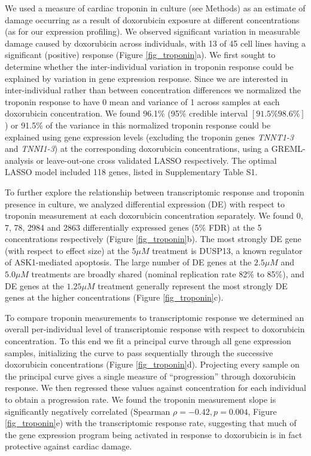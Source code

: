 \documentclass{article}
\begin{document}
We used a measure of cardiac troponin in culture (see Methods) as an estimate of damage occurring as a result of doxorubicin exposure at different concentrations (as for our expression profiling). We observed significant variation in measurable damage caused by doxorubicin across individuals, with 13 of 45 cell lines having a significant (positive) response (Figure \ref{fig_troponin}a). We first sought to determine whether the inter-individual variation in troponin response could be explained by variation in gene expression response. Since we are interested in inter-individual rather than between concentration differences we normalized the troponin response to have 0 mean and variance of 1 across samples at each doxorubicin concentration. We found 96.1\% (95\% credible interval $[91.5\% 98.6\%]$) or 91.5\% of the variance in this normalized troponin response could be explained using gene expression levels (excluding the troponin genes \emph{TNNT1-3} and \emph{TNNI1-3}) at the corresponding doxorubicin concentrations, using a GREML-analysis\cite{Yang2010-cx} or leave-out-one cross validated LASSO\cite{tibshirani1996regression} respectively. The optimal LASSO model included 118 genes, listed in Supplementary Table S1. 

To further explore the relationship between transcriptomic response and troponin presence in culture, we analyzed differential expression (DE) with respect to troponin measurement at each doxorubicin concentration separately. We found 0, 7, 78, 2984 and 2863 differentially expressed genes (5\% FDR) at the 5 concentrations respectively (Figure \ref{fig_troponin}b). The most strongly DE gene (with respect to effect size) at the $5 \mu M$ treatment is DUSP13, a known regulator of ASK1-mediated apoptosis\cite{park2010positive}. The large number of DE genes at the $2.5 \mu M$ and $5.0 \mu M$ treatments are broadly shared (nominal replication rate 82\% to 85\%), and DE genes at the $1.25 \mu M$ treatment generally represent the most strongly DE genes at the higher concentrations (Figure \ref{fig_troponin}c). 

To compare troponin measurements to transcriptomic response we determined an overall per-individual level of transcriptomic response with respect to doxorubicin concentration. To this end we fit a principal curve\citep{hastie1989principal} through all gene expression samples, initializing the curve to pass sequentially through the successive doxorubicin concentrations (Figure \ref{fig_troponin}d). Projecting every sample on the principal curve gives a single measure of ``progression'' through doxorubicin response. We then regressed these values against concentration for each individual to obtain a progression rate. We found the troponin measurement slope is significantly negatively correlated (Spearman $\rho=-0.42, p=0.004$, Figure \ref{fig_troponin}e) with the transcriptomic response rate, suggesting that much of the gene expression program being activated in response to doxorubicin is in fact protective against cardiac damage. 
\end{document}
